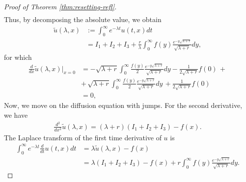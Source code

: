 \documentclass[11pt,a4paper]{article}
\theoremstyle{definition}
\theoremstyle{remark}
\begin{document}
\begin{proof}[Proof of Theorem \ref{thm:resetting-refl}]
\begin{align*}
		\end{align*}
		Thus, by decomposing the absolute value, we obtain
		\begin{align*}
			\widetilde{u}(\lambda, x)&:= \int_{0}^\infty e^{-\lambda t} u(t,x) dt \\
			&= I_1+I_2+I_3 +  \frac{r}{\lambda} \int_{0}^\infty f(y) \frac{e^{-y \sqrt{\lambda + r}}}{\sqrt{\lambda + r}} dy,
		\end{align*}
		for which
		\begin{align*}
			\frac{d}{dx} \widetilde{u}(\lambda, x) \vert_{x=0} &= - \sqrt{\lambda + r} \int_{0}^\infty \frac{f(y)}{2} \frac{e^{-y \sqrt{\lambda + r}}}{\sqrt{\lambda + r}} dy - \frac{1}{2\sqrt{\lambda + r}} f(0)\, + \\ & +\,\sqrt{\lambda + r} \int_{0}^{\infty} \frac{f(y)}{2} \frac{e^{-y \sqrt{\lambda + r}}}{\sqrt{\lambda + r}} dy 
			\, + \frac{1}{2\sqrt{\lambda + r}} f(0)\\
			&= 0,
		\end{align*}
		Now, we move on the diffusion equation with jumps. 
		For the second derivative, we have
		\begin{align*}
			\frac{d^2}{dx^2} \widetilde{u}(\lambda, x) %
			= (\lambda + r) (I_1+I_2+I_3) - f(x).
		\end{align*}
		The Laplace transform of the first time derivative of $u$ is
		\begin{align*}
			\int_{0}^{\infty} e^{-\lambda t} \frac{d}{dt} u(t,x) dt&= \lambda \widetilde{u}(\lambda, x) - f(x)\\
			&= \lambda (I_1+I_2+I_3) - f(x) + r \int_{0}^\infty f(y) \frac{e^{-y \sqrt{\lambda + r}}}{\sqrt{\lambda + r}} dy.
		\end{align*}

\end{proof}
\end{document}
